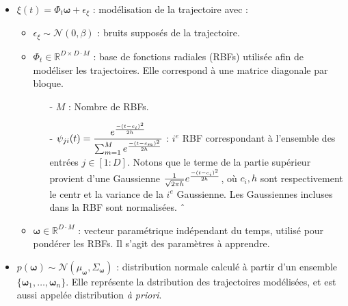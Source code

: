 \documentclass[utf8]{frontiersSCNS} %
\newcommand{\rev}[1]{\textcolor{blue}{#1}}
\newcommand{\todo}[1]{\textcolor{red}{\textbf{/*#1*/}}}
\begin{document}
\begin{itemize}
\item $\xi(t) = \Phi_t \boldsymbol{\omega} + \epsilon_\xi$ : modélisation de la trajectoire avec :
\begin{itemize}
\item $\epsilon_\xi \sim \mathcal{N}(0, \beta)$ : bruits supposés de la trajectoire.
\item $\Phi_t \in \mathbb{R}^{D\times D \cdot M}$ : base de fonctions radiales (RBFs) utilisée afin de modéliser les trajectoires. Elle correspond à une matrice diagonale par bloque.
\begin{itemize}
\item[-] $M$ : Nombre de RBFs.
\item[-] $ \psi_{ji}(t) =\dfrac{e^{-(t - c_i)^2 \over 2h}}{\sum_{m=1}^{M} e^{-(t - c_m)^2 \over 2h} }$ : $i^e$ RBF correspondant à l'ensemble des entrées $j \in [1:D]$. 
Notons que le terme de la partie supérieur provient d'une Gaussienne $\frac{1}{\sqrt{2\pi h}} e^{-(t - c_i)^2 \over 2h}$, où $ c_i, h$ sont respectivement le centr et la variance de la $i^e$ Gaussienne. Les Gaussiennes incluses dans la RBF sont normalisées.
ˆ%
\end{itemize}
\item $\boldsymbol{\omega} \in \mathbb{R}^{D \cdot M}$ : vecteur paramétrique indépendant du temps, utilisé pour pondérer les RBFs. Il s'agit des paramètres à apprendre.

\end{itemize}

\item $p(\boldsymbol{\omega}) \sim \mathcal{N}(\mu_{\boldsymbol{\omega}}, \Sigma_{\boldsymbol{\omega}})$ : distribution normale calculé à partir d'un ensemble $\{\boldsymbol{\omega}_1, \ldots, \boldsymbol{\omega}_n\}$.  Elle représente la dstribution des trajectoires modélisées, et est aussi appelée distribution \textit{à priori}.


\end{itemize}
\end{document}
